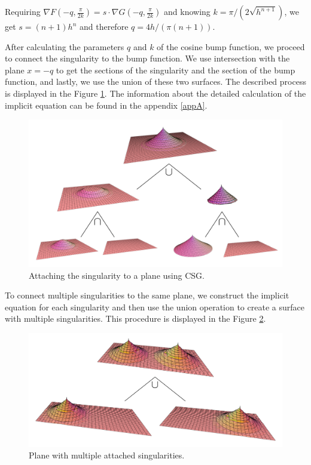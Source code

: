 Requiring $\nabla F (-q, \frac{\pi}{2k}) = s \cdot \nabla G (-q, \frac{\pi}{2k})$
and knowing $k=\pi/(2\sqrt{h^{n+1}})$, we get $s=(n+1)h^n$ and therefore $q=4h/(\pi(n+1))$.

After calculating the parameters $q$ and $k$ of the cosine bump function, 
we proceed to connect the singularity to the bump function.
We use intersection with the plane $x=-q$ to get the sections of the singularity
and the section of the bump function, and lastly, we use the union of these two 
surfaces. The described process is displayed in the Figure \ref{img:26}.
The information about the detailed calculation of the implicit equation 
can be found in the appendix \ref{appA}.

\begin{figure}
    \centerline{\includegraphics[scale=0.5]{images/img26}}
    \caption[Attaching the singularity to a plane using CSG]
    {Attaching the singularity to a plane using CSG.}
    \label{img:26}
\end{figure}

To connect multiple singularities to the same plane, we construct the implicit
equation for each singularity and then use the union operation to
create a surface with multiple singularities. This procedure is displayed in
the Figure \ref{img:28}.

\begin{figure}
    \centerline{\includegraphics[scale=0.5]{images/img28}}
    \caption[Plane with multiple attached singularities]
    {Plane with multiple attached singularities.}
    \label{img:28}
\end{figure}

